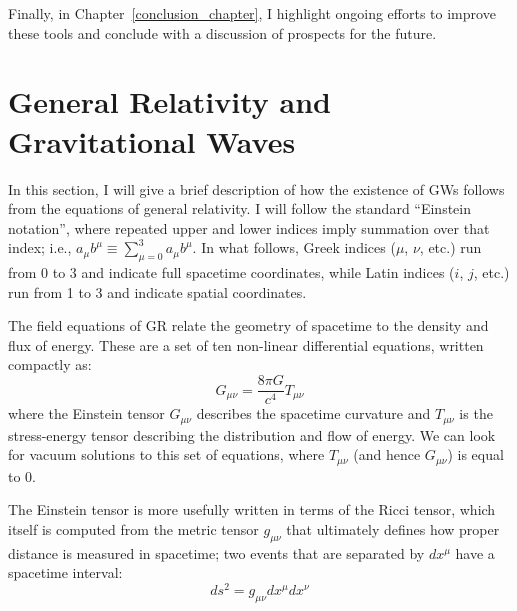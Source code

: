\begin{refsection}
Finally, in Chapter~\ref{conclusion_chapter}, I highlight ongoing efforts to improve these tools and conclude with a discussion of prospects for the future.

\section{General Relativity and Gravitational Waves}
\label{intro_sec:gr-math}

In this section, I will give a brief description of how the existence of GWs follows from the equations of general relativity.
I will follow the standard ``Einstein notation'', where repeated upper and lower indices imply summation over that index; i.e., $a_\mu b^\mu \equiv \sum_{\mu=0}^3 a_\mu b^\mu$.
In what follows, Greek indices ($\mu$, $\nu$, etc.) run from 0 to 3 and indicate full spacetime coordinates, while Latin indices ($i$, $j$, etc.) run from 1 to 3 and indicate spatial coordinates.

The field equations of GR relate the geometry of spacetime to the density and flux of energy.
These are a set of ten non-linear differential equations, written compactly as:
\begin{equation}
    G_{\mu\nu} = \frac{8\pi G}{c^4} T_{\mu\nu}
\end{equation}
where the Einstein tensor $G_{\mu\nu}$ describes the spacetime curvature and $T_{\mu\nu}$ is the stress-energy tensor describing the distribution and flow of energy.
We can look for vacuum solutions to this set of equations, where $T_{\mu\nu}$ (and hence $G_{\mu\nu}$) is equal to 0.

The Einstein tensor is more usefully written in terms of the Ricci tensor, which itself is computed from the metric tensor $g_{\mu\nu}$ that ultimately defines how proper distance is measured in spacetime; two events that are separated by $dx^\mu$ have a spacetime interval:
\begin{equation}
    \label{eq:ds}
    ds^2 = g_{\mu\nu} dx^\mu dx^\nu
\end{equation}


\end{refsection}
